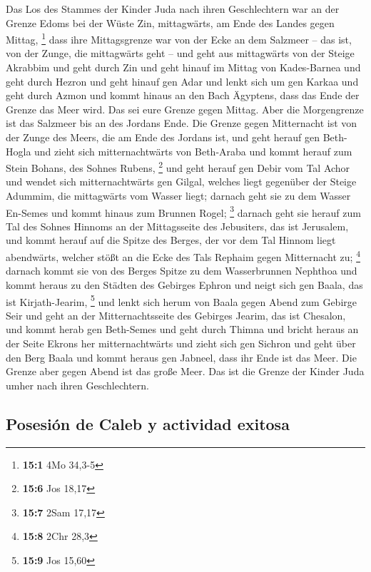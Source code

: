  Das Los des Stammes der Kinder Juda nach ihren
Geschlechtern war an der Grenze Edoms bei der Wüste Zin, mittagwärts, am
Ende des Landes gegen Mittag, \footnote{\textbf{15:1} 4Mo 34,3-5}
 dass ihre Mittagsgrenze war von der Ecke an dem Salzmeer
-- das ist, von der Zunge, die mittagwärts geht --  und
geht aus mittagwärts von der Steige Akrabbim und geht durch Zin und geht
hinauf im Mittag von Kades-Barnea und geht durch Hezron und geht hinauf
gen Adar und lenkt sich um gen Karkaa  und geht durch
Azmon und kommt hinaus an den Bach Ägyptens, dass das Ende der Grenze
das Meer wird. Das sei eure Grenze gegen Mittag.  Aber die
Morgengrenze ist das Salzmeer bis an des Jordans Ende. Die Grenze gegen
Mitternacht ist von der Zunge des Meers, die am Ende des Jordans ist,
 und geht herauf gen Beth-Hogla und zieht sich
mitternachtwärts von Beth-Araba und kommt herauf zum Stein Bohans, des
Sohnes Rubens, \footnote{\textbf{15:6} Jos 18,17}  und
geht herauf gen Debir vom Tal Achor und wendet sich mitternachtwärts gen
Gilgal, welches liegt gegenüber der Steige Adummim, die mittagwärts vom
Wasser liegt; darnach geht sie zu dem Wasser En-Semes und kommt hinaus
zum Brunnen Rogel; \footnote{\textbf{15:7} 2Sam 17,17} 
darnach geht sie herauf zum Tal des Sohnes Hinnoms an der Mittagsseite
des Jebusiters, das ist Jerusalem, und kommt herauf auf die Spitze des
Berges, der vor dem Tal Hinnom liegt abendwärts, welcher stößt an die
Ecke des Tals Rephaim gegen Mitternacht zu; \footnote{\textbf{15:8} 2Chr
  28,3}  darnach kommt sie von des Berges Spitze zu dem
Wasserbrunnen Nephthoa und kommt heraus zu den Städten des Gebirges
Ephron und neigt sich gen Baala, das ist Kirjath-Jearim, \footnote{\textbf{15:9}
  Jos 15,60}  und lenkt sich herum von Baala gegen Abend
zum Gebirge Seir und geht an der Mitternachtsseite des Gebirges Jearim,
das ist Chesalon, und kommt herab gen Beth-Semes und geht durch Thimna
 und bricht heraus an der Seite Ekrons her
mitternachtwärts und zieht sich gen Sichron und geht über den Berg Baala
und kommt heraus gen Jabneel, dass ihr Ende ist das Meer.
 Die Grenze aber gegen Abend ist das große Meer. Das ist
die Grenze der Kinder Juda umher nach ihren Geschlechtern.

\hypertarget{posesiuxf3n-de-caleb-y-actividad-exitosa}{%
\subsection{Posesión de Caleb y actividad
exitosa}\label{posesiuxf3n-de-caleb-y-actividad-exitosa}}

